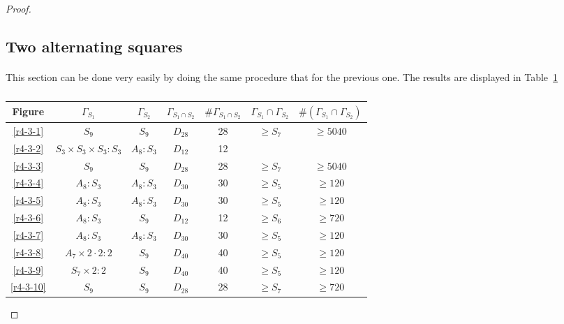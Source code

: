 \begin{proof}
\subsection{Two alternating squares}
  \paragraph{}
  This section can be done very easily by doing the same procedure that for the previous one. The results are displayed in Table~\ref{results-2-3}

  \begin{table}
    \centering
    \begin{tabular}{|c|c|c|c|c|c|c|}
      \hline
      Figure & $\Gamma_{S_1}$ & $\Gamma_{S_2}$ & $\Gamma_{S_1 \cap S_2}$ & $\#\Gamma_{S_1 \cap S_2}$ & $\Gamma_{S_1} \cap \Gamma_{S_2}$ & $\#(\Gamma_{S_1} \cap \Gamma_{S_2})$ \\ \hline

      \ref{r4-3-1} & $S_9$ & $S_9$ & $D_{28}$ & 28 & $\ge S_7$ & $\ge 5040$ \\ \hline
      \ref{r4-3-2} & $S_3 \times S_3 \times S_3:S_3$ & $A_8 : S_3$ & $D_{12}$ & 12 & & \\ \hline
      \ref{r4-3-3} & $S_9$ & $S_9$ & $D_{28}$ & 28 & $\ge S_7$ & $\ge 5040$ \\ \hline
      \ref{r4-3-4} & $A_8 : S_3$ & $A_8 : S_3$ & $D_{30}$ & 30 & $\ge S_5$ & $\ge 120$ \\ \hline
      \ref{r4-3-5} & $A_8 : S_3$ & $A_8 : S_3$ & $D_{30}$ & 30 & $\ge S_5$ & $\ge 120$ \\ \hline
      \ref{r4-3-6} & $A_8 : S_3$ & $S_9$ & $D_{12}$ & 12 & $\ge S_6$ & $\ge 720$ \\ \hline
      \ref{r4-3-7} & $A_8 : S_3$ & $A_8 : S_3$ & $D_{30}$ & 30 & $\ge S_5$ & $\ge 120$  \\ \hline
      \ref{r4-3-8} & $A_7 \times 2 \cdot 2 : 2$ & $S_9$ & $D_{40}$ & 40 & $\ge S_5$ & $\ge 120$ \\ \hline
      \ref{r4-3-9} & $S_7 \times 2:2$ & $S_9$ & $D_{40}$ & 40 & $\ge S_5$ & $\ge 120$ \\ \hline
      \ref{r4-3-10}& $S_9$ & $S_9$ & $D_{28}$ & 28 & $\ge S_7$ & $\ge 720$ \\ \hline

    \end{tabular}
    \caption{}
    \label{results-2-3}
  \end{table}

\end{proof}
